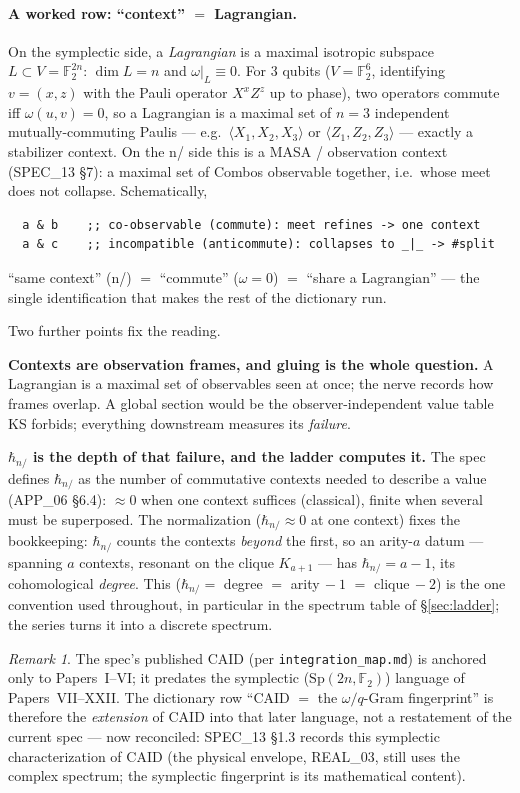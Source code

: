 \documentclass[11pt,a4paper]{article}
\newcommand{\Sp}{\mathrm{Sp}}
\newcommand{\F}{\mathbb{F}}
\newcommand{\hbarn}{\hbar_{n/}}
\theoremstyle{plain}
\theoremstyle{definition}
\theoremstyle{remark}
\newtheorem*{remark}{Remark}
\begin{document}
\paragraph{A worked row: ``context'' $=$ Lagrangian.} On the symplectic side, a
\emph{Lagrangian} is a maximal isotropic subspace $L\subset V=\F_2^{2n}$:
$\dim L=n$ and $\omega|_{L}\equiv0$. For $3$ qubits ($V=\F_2^6$, identifying
$v=(x,z)$ with the Pauli operator $X^xZ^z$ up to phase), two operators commute iff
$\omega(u,v)=0$, so a Lagrangian is a maximal set of $n=3$ independent
mutually-commuting Paulis --- e.g.\ $\langle X_1,X_2,X_3\rangle$ or
$\langle Z_1,Z_2,Z_3\rangle$ --- exactly a stabilizer context. On the n/ side this
is a MASA / observation context (SPEC\_13 \S7): a maximal set of Combos observable
together, i.e.\ whose meet does not collapse. Schematically,
\begin{verbatim}
  a & b    ;; co-observable (commute): meet refines -> one context
  a & c    ;; incompatible (anticommute): collapses to _|_ -> #split
\end{verbatim}
``same context'' (n/) $=$ ``commute'' ($\omega=0$) $=$ ``share a Lagrangian'' ---
the single identification that makes the rest of the dictionary run.

Two further points fix the reading.

\textbf{Contexts are observation frames, and gluing is the whole question.} A
Lagrangian is a maximal set of observables seen at once; the nerve records how
frames overlap. A global section would be the observer-independent value table KS
forbids; everything downstream measures its \emph{failure}.

\textbf{$\hbarn$ is the depth of that failure, and the ladder computes it.} The
spec defines $\hbarn$ as the number of commutative contexts needed to describe a
value (APP\_06 \S6.4): $\approx0$ when one context suffices (classical), finite
when several must be superposed. The normalization ($\hbarn\approx0$ at one
context) fixes the bookkeeping: $\hbarn$ counts the contexts \emph{beyond} the
first, so an arity-$a$ datum --- spanning $a$ contexts, resonant on the clique
$K_{a+1}$ --- has $\hbarn=a-1$, its cohomological \emph{degree}. This
($\hbarn=$ degree $=$ arity$\,-1$ $=$ clique$\,-2$) is the one convention used
throughout, in particular in the spectrum table of \S\ref{sec:ladder}; the
series turns it into a discrete spectrum.

\begin{remark}
The spec's published CAID (per \texttt{integration\_map.md}) is anchored only to
Papers~I--VI; it predates the symplectic ($\Sp(2n,\F_2)$) language of
Papers~VII--XXII. The dictionary row ``CAID $=$ the $\omega/q$-Gram fingerprint''
is therefore the \emph{extension} of CAID into that later language, not a
restatement of the current spec --- now reconciled: SPEC\_13 \S1.3 records this
symplectic characterization of CAID (the physical envelope, REAL\_03, still uses
the complex spectrum; the symplectic fingerprint is its mathematical content).
\end{remark}
\end{document}
